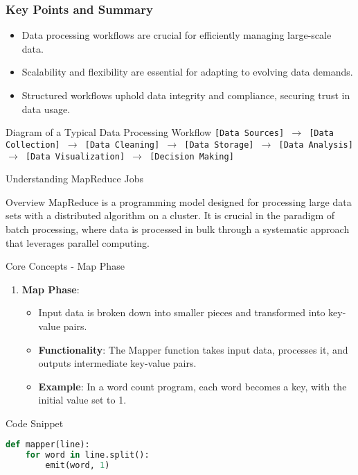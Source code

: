 \documentclass[aspectratio=169]{beamer}
\begin{document}
\begin{frame}[fragile]
    \frametitle{Key Points and Summary}
    \begin{itemize}
        \item Data processing workflows are crucial for efficiently managing large-scale data.
        \item Scalability and flexibility are essential for adapting to evolving data demands.
        \item Structured workflows uphold data integrity and compliance, securing trust in data usage.
    \end{itemize}
    \begin{block}{Diagram of a Typical Data Processing Workflow}
        \centering
        \texttt{[Data Sources] $\rightarrow$ [Data Collection] $\rightarrow$ [Data Cleaning] $\rightarrow$ [Data Storage] $\rightarrow$ [Data Analysis] $\rightarrow$ [Data Visualization] $\rightarrow$ [Decision Making]}
    \end{block}
\end{frame}

\begin{frame}{Understanding MapReduce Jobs}
    \begin{block}{Overview}
        MapReduce is a programming model designed for processing large data sets with a distributed algorithm on a cluster. 
        It is crucial in the paradigm of batch processing, where data is processed in bulk through a systematic approach that leverages parallel computing.
    \end{block}
\end{frame}

\begin{frame}{Core Concepts - Map Phase}
    \begin{enumerate}
        \item \textbf{Map Phase}:
        \begin{itemize}
            \item Input data is broken down into smaller pieces and transformed into key-value pairs.
            \item \textbf{Functionality}: The Mapper function takes input data, processes it, and outputs intermediate key-value pairs.
            \item \textbf{Example}: In a word count program, each word becomes a key, with the initial value set to 1.
        \end{itemize}
    \end{enumerate}

    \begin{block}{Code Snippet}
        \begin{lstlisting}[language=Python]
def mapper(line):
    for word in line.split():
        emit(word, 1)
        \end{lstlisting}
    \end{block}
\end{frame}
\end{document}
